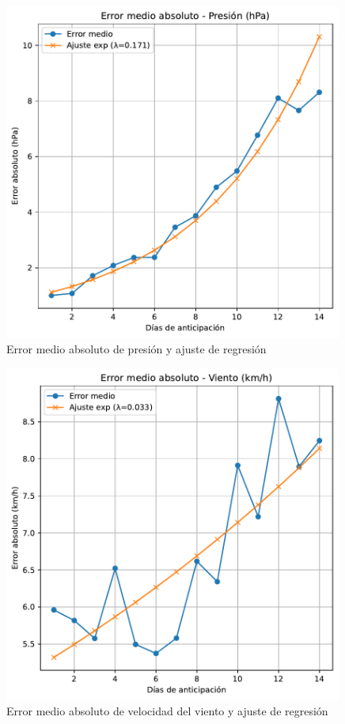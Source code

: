 \documentclass[
  10pt,
  a4paper,
  DIV=11,
  numbers=noendperiod,
  open=any]{scrreprt}
\numberwithin{equation}{chapter}
\numberwithin{equation}{section}
\renewcommand{\[}{\begin{equation}}
\renewcommand{\]}{\end{equation}}
\begin{document}
\begin{figure}[h]
  \centering
  \includegraphics[width=0.99\textwidth]{03-meteorologia/predicciones_files/figure-pdf/cell-4-output-3.pdf}
  \caption{Error medio absoluto de presión y ajuste de regresión}
\end{figure}

\begin{figure}[h]
  \centering
  \includegraphics[width=0.99\textwidth]{03-meteorologia/predicciones_files/figure-pdf/cell-4-output-4.pdf}
  \caption{Error medio absoluto de velocidad del viento y ajuste de regresión}
\end{figure}
\end{document}
